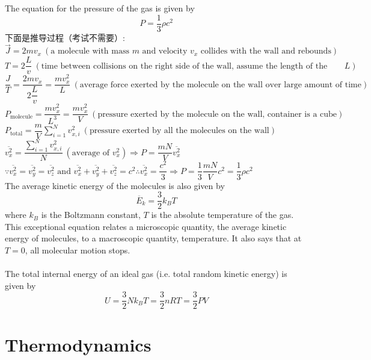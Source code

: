 \documentclass[a4paper,12pt]{article}
\begin{document}
The equation for the pressure of the gas is given by
\[P=\dfrac{1}{3}\rho c^2\]
下面是推导过程（考试不需要）:\\
$\vec{J}=2mv_x\ (\text{a molecule with mass $m$ and velocity $v_x$ collides with the wall and rebounds})$\\
$T=2\dfrac{L}{v}\ (\text{time between collisions on the right side of the wall, assume the length of the container is $L$})$\\
$\dfrac{J}{T}=\dfrac{2mv_x}{2\dfrac{L}{v}}=\dfrac{mv_x^2}{L}\ (\text{average force exerted by the molecule on the wall over large amount of time})$\\
$P_\text{molecule}=\dfrac{mv_x^2}{L^3}=\dfrac{mv_x^2}{V}\ (\text{pressure exerted by the molecule on the wall, container is a cube})$\\
$\displaystyle P_\text{total}=\dfrac{m}{V}\sum_{i=1}^{N}v_{x,i}^2\ (\text{pressure exerted by all the molecules on the wall})$\\
$\overline{v_x^2}=\dfrac{\sum_{i=1}^{N}v_{x,i}^2}{N}\ (\text{average of $v_x^2$}) \Rightarrow P=\dfrac{mN}{V}\overline{v_x^2}$\\
$\because \overline{v_x^2}=\overline{v_y^2}=\overline{v_z^2}\text{ and } \overline{v_x^2}+\overline{v_y^2}+\overline{v_z^2}=c^2 \therefore \overline{v_x^2}=\dfrac{c^2}{3} \Rightarrow P=\dfrac{1}{3}\dfrac{mN}{V}c^2=\dfrac{1}{3}\rho c^2$\\
The average kinetic energy of the molecules is also given by
\[ \overline{E}_k = \dfrac{3}{2}k_BT\]
where $k_B$ is the Boltzmann constant, $T$ is the absolute temperature of the gas.\\
This exceptional equation relates a microscopic quantity, the average kinetic energy of molecules, to a macroscopic quantity, temperature. It also says that at $T = 0$, all molecular motion stops.\\\\
The total internal energy of an ideal gas (i.e. total random kinetic energy) is given by
\[U=\dfrac{3}{2}Nk_BT=\dfrac{3}{2}nRT=\dfrac{3}{2}PV\]
\section{Thermodynamics}
\end{document}
